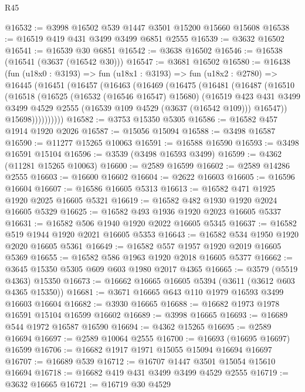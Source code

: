 \begin{lexlean}{R45}
\begin{coremodule}
@16532 := @3998 @16502 @539 @1447 @3501 @15200 @15660 @15608
@16538 := @16519 @419 @431 @3499 @3499 @6851 @2555
@16539 := @3632 @16502
@16541 := @16539 @30 @6851
@16542 := @3638 @16502
@16546 := @16538 (@16541 (@3637 (@16542 @30)))
@16547 := @3681 @16502
@16580 := @16438
    (fun (u18x0 : @3193) =>
    fun (u18x1 : @3193) =>
    fun (u18x2 : @2780) =>
    @16445
      (@16451
        (@16457
          (@16463
            (@16469
              (@16475
                (@16481
                  (@16487
                    (@16510
                      (@16518
                        (@16525
                          (@16532 (@16546 @16547) @15680)
                          (@16519
                            @423
                            @431
                            @3499
                            @3499
                            @4529
                            @2555
                            (@16539 @109 @4529 (@3637 (@16542 @109)))
                            @16547))
                        @15698))))))))))
@16582 := @3753 @15350 @5305
@16586 := @16582 @457 @1914 @1920 @2026
@16587 := @15056 @15094
@16588 := @3498 @16587
@16590 := @11277 @15265 @10063
@16591 := @16588 @16590
@16593 := @3498 @16591 @15104
@16596 := @3539 (@3498 @16593 @3499)
@16599 := @4362 (@11281 @15265 @10063)
@16600 := @2589 @16599
@16602 := @2589 @14286 @2555
@16603 := @16600 @16602
@16604 := @2622 @16603
@16605 := @16596 @16604
@16607 := @16586 @16605 @5313
@16613 := @16582 @471 @1925 @1920 @2025 @16605 @5321
@16619 := @16582 @482 @1930 @1920 @2024 @16605 @5329
@16625 := @16582 @493 @1936 @1920 @2023 @16605 @5337
@16631 := @16582 @506 @1940 @1920 @2022 @16605 @5345
@16637 := @16582 @519 @1944 @1920 @2021 @16605 @5353
@16643 := @16582 @534 @1950 @1920 @2020 @16605 @5361
@16649 := @16582 @557 @1957 @1920 @2019 @16605 @5369
@16655 := @16582 @586 @1963 @1920 @2018 @16605 @5377
@16662 := @3645 @15350 @5305 @609 @603 @1980 @2017 @4365
@16665 := @3579 (@5519 @4363) @15350
@16673 := @16662 @16665 @16605 @5394 (@3611 (@3612 @603 @4365 @15350))
@16681 := @3671 @16665 @643 @110 @1979 @16593 @3499 @16603 @16604
@16682 := @3930 @16665
@16688 := @16682 @1973 @1978 @16591 @15104 @16599 @16602
@16689 := @3998 @16665
@16693 := @16689 @544 @1972 @16587 @16590
@16694 := @4362 @15265
@16695 := @2589 @16694
@16697 := @2589 @10064 @2555
@16700 := @16693 (@16695 @16697) @16599
@16706 := @16682 @1917 @1971 @15055 @15094 @16694 @16697
@16707 := @16689 @539
@16712 := @16707 @1447 @3501 @15054 @15610 @16694
@16718 := @16682 @419 @431 @3499 @3499 @4529 @2555
@16719 := @3632 @16665
@16721 := @16719 @30 @4529

\end{coremodule}
\end{lexlean}
